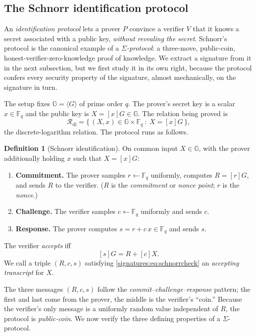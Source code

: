 \documentclass[11pt,a4paper]{article}
\theoremstyle{definition}
\newtheorem{definition}[theorem]{Definition}
\theoremstyle{remark}
\newcommand{\G}{\ensuremath{\mathbb{G}}}
\newcommand{\Fq}{\ensuremath{\mathbb{F}_{q}}}
\begin{document}
\subsection{The Schnorr identification protocol}\label{signatures:subsec:identification}

An \emph{identification protocol} lets a prover \(P\) convince a verifier \(V\) that it knows a secret associated with a public key, \emph{without revealing the secret}. Schnorr's protocol is the canonical example of a \emph{\(\Sigma\)-protocol}: a three-move, public-coin, honest-verifier-zero-knowledge proof of knowledge. We extract a signature from it in the next subsection, but we first study it in its own right, because the protocol confers every security property of the signature, almost mechanically, on the signature in turn.

The setup fixes \(\G = \langle G \rangle\) of prime order \(q\). The prover's secret key is a scalar \(x \in \Fq\) and the public key is \(X = [x]G \in \G\). The relation being proved is
\[
  \mathcal{R}_{\mathrm{dl}} = \{\, (X, x) \in \G \times \Fq \ : \ X = [x]G \,\},
\]
the discrete-logarithm relation. The protocol runs as follows.

\begin{definition}[Schnorr identification]\label{signatures:def:schnorrid}
On common input \(X \in \G\), with the prover additionally holding \(x\) such that \(X = [x]G\):
\begin{enumerate}
  \item \textbf{Commitment.} The prover samples \(r \gets \Fq\) uniformly, computes \(R = [r]G\), and sends \(R\) to the verifier. (\(R\) is the \emph{commitment} or \emph{nonce point}; \(r\) is the \emph{nonce}.)
  \item \textbf{Challenge.} The verifier samples \(c \gets \Fq\) uniformly and sends \(c\).
  \item \textbf{Response.} The prover computes \(s = r + c\,x \in \Fq\) and sends \(s\).
\end{enumerate}
The verifier \emph{accepts} iff
\[
  [s]G = R + [c]X. \tag{$\ast$}\label{signatures:eq:schnorrcheck}
\]
We call a triple \((R, c, s)\) satisfying \eqref{signatures:eq:schnorrcheck} an \emph{accepting transcript} for \(X\).
\end{definition}

The three messages \((R, c, s)\) follow the \emph{commit--challenge--response} pattern; the first and last come from the prover, the middle is the verifier's ``coin.'' Because the verifier's only message is a uniformly random value independent of \(R\), the protocol is \emph{public-coin}. We now verify the three defining properties of a \(\Sigma\)-protocol.
\end{document}
